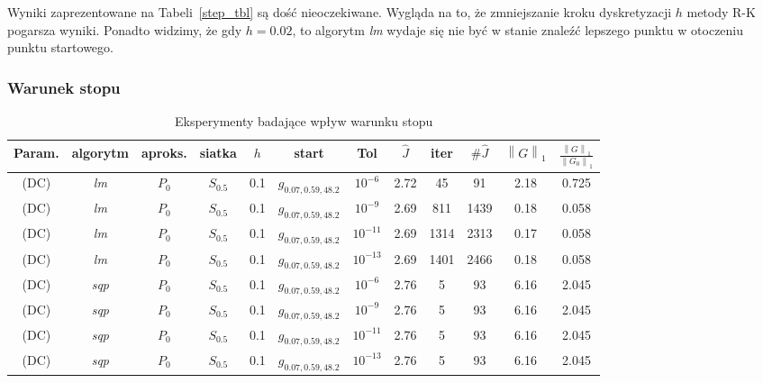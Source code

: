 \documentclass[11pt]{article}
\newcommand{\norm}[1]{\left\lVert#1\right\rVert}
\begin{document}
Wyniki zaprezentowane na Tabeli~\ref{step_tbl} są dość nieoczekiwane. Wygląda na to, że zmniejszanie kroku dyskretyzacji $h$ metody R-K pogarsza wyniki. Ponadto widzimy, że gdy $h = 0.02$, to algorytm {\it lm\/} wydaje się nie być w stanie znaleźć lepszego punktu w otoczeniu punktu startowego.

\subsubsection{Warunek stopu}

\begin{table}[h]
  \begin{center}
    \begin{tabular}{|c|c|c|c|c|c|c||c|c|c|c|c|}
      \hline
      Param. & algorytm & aproks. & siatka & $h$ & start & Tol & $\hat{J}$ & iter & $\#\hat{J}$ & $\norm{G}_1$ & $\frac{\norm{G}_1}{\norm{G_0}_1}$ \\
      \hline
      (DC) & {\it lm\/} & $P_0$ & $S_{0.5}$ & 0.1 & $g_{0.07,0.59,48.2}$ & $10^{-6}$ & 2.72 & 45 & 91 & 2.18 & 0.725 \\
      \hline
      (DC) & {\it lm\/} & $P_0$ & $S_{0.5}$ & 0.1 & $g_{0.07,0.59,48.2}$ & $10^{-9}$ & 2.69 & 811 & 1439 & 0.18 & 0.058 \\
      \hline
      (DC) & {\it lm\/} & $P_0$ & $S_{0.5}$ & 0.1 & $g_{0.07,0.59,48.2}$ & $10^{-11}$ & 2.69 & 1314 & 2313 & 0.17 & 0.058 \\
      \hline
      (DC) & {\it lm\/} & $P_0$ & $S_{0.5}$ & 0.1 & $g_{0.07,0.59,48.2}$ & $10^{-13}$ & 2.69 & 1401 & 2466 & 0.18 & 0.058 \\
      \hline
      (DC) & {\it sqp\/} & $P_0$ & $S_{0.5}$ & 0.1 & $g_{0.07,0.59,48.2}$ & $10^{-6}$ & 2.76 & 5 & 93 & 6.16 & 2.045 \\
      \hline
      (DC) & {\it sqp\/} & $P_0$ & $S_{0.5}$ & 0.1 & $g_{0.07,0.59,48.2}$ & $10^{-9}$ & 2.76 & 5 & 93 & 6.16 & 2.045 \\
      \hline
      (DC) & {\it sqp\/} & $P_0$ & $S_{0.5}$ & 0.1 & $g_{0.07,0.59,48.2}$ & $10^{-11}$ & 2.76 & 5 & 93 & 6.16 & 2.045 \\
      \hline
      (DC) & {\it sqp\/} & $P_0$ & $S_{0.5}$ & 0.1 & $g_{0.07,0.59,48.2}$ & $10^{-13}$ & 2.76 & 5 & 93 & 6.16 & 2.045 \\
      \hline
    \end{tabular}
    \caption{Eksperymenty badające wpływ warunku stopu}\label{tol_tbl}
  \end{center}
\end{table}
\end{document}
